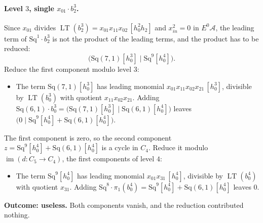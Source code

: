 \documentclass[11pt]{article}
\newcommand{\Sq}{\mathrm{Sq}}
\newcommand{\A}{\mathcal{A}}
\DeclareMathOperator{\LT}{LT}
\begin{document}
\paragraph{Level $3$, single $x_{01}\cdot b^{3}_{2}$.} Since $x_{01}$ divides $\LT(b^{3}_{2}) = x_{01}x_{11}x_{02}\,[h_0^2h_2]$ and $x_{in}^2 = 0$ in $E^0\A$, the leading term of $\Sq^{1}\cdot b^{3}_{2}$ is not the product of the leading terms, and the product has to be reduced:
\[\bigl(\Sq(7,1)[h_0^3] \;\big|\; \Sq^{9}[h_0^4]\bigr).\]
Reduce the first component modulo level $3$:
\begin{itemize}
\item The term $\Sq(7,1)[h_0^3]$ has leading monomial $x_{01}x_{11}x_{02}x_{21}\,[h_0^3]$, divisible by $\LT(b^{3}_{0})$ with quotient $x_{11}x_{02}x_{21}$. Adding $\Sq(6,1)\cdot b^{3}_{0} = \bigl(\Sq(7,1)[h_0^3] \;\big|\; \Sq(6,1)[h_0^4]\bigr)$ leaves $\bigl(0 \;\big|\; \Sq^{9}[h_0^4] + \Sq(6,1)[h_0^4]\bigr)$.
\end{itemize}
The first component is zero, so the second component $z = \Sq^{9}[h_0^4] + \Sq(6,1)[h_0^4]$ is a cycle in $C_{4}$.
Reduce it modulo $\operatorname{im}(d\colon C_{5}\to C_{4})$, the first components of level $4$:
\begin{itemize}
\item The term $\Sq^{9}[h_0^4]$ has leading monomial $x_{01}x_{31}\,[h_0^4]$, divisible by $\LT(b^{4}_{0})$ with quotient $x_{31}$. Adding $\Sq^{8}\cdot \pi_1(b^{4}_{0}) = \Sq^{9}[h_0^4] + \Sq(6,1)[h_0^4]$ leaves $0$.
\end{itemize}
\textbf{Outcome: useless.} Both components vanish, and the reduction contributed nothing.
\medskip
\end{document}
